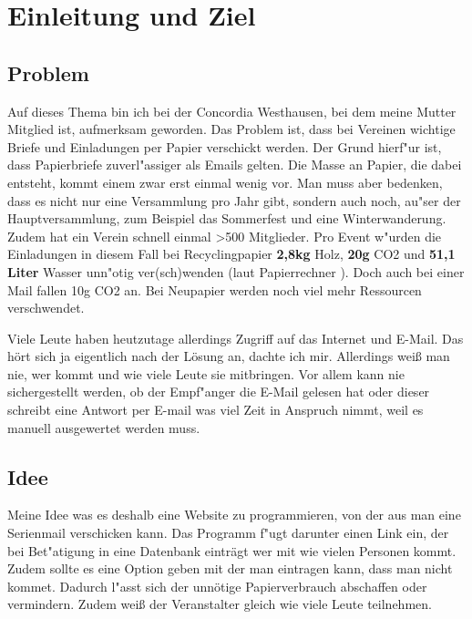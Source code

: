 \documentclass[12pt,twoside]{article}  %
\begin{document}
  \section{Einleitung und Ziel} %
    \subsection{Problem}
    Auf dieses Thema bin ich bei der Concordia Westhausen, bei dem meine Mutter Mitglied ist, aufmerksam geworden. 
    Das Problem ist, dass bei Vereinen wichtige Briefe und Einladungen per Papier verschickt werden. Der Grund hierf"ur ist, 
    dass Papierbriefe zuverl"assiger als Emails gelten. Die Masse an Papier, die dabei entsteht, kommt einem zwar erst einmal 
    wenig vor. Man muss aber bedenken, dass es nicht nur eine Versammlung pro Jahr gibt, sondern auch noch, au"ser der 
    Hauptversammlung, zum Beispiel das Sommerfest und eine Winterwanderung. Zudem hat ein Verein schnell einmal >500 Mitglieder.
    Pro Event w"urden die Einladungen in diesem Fall bei Recyclingpapier \textbf{2,8kg} Holz, \textbf{20g} CO2 und \textbf{51,1 Liter} Wasser unn"otig ver(sch)wenden (laut Papierrechner \cite{Papiergewicht}). Doch auch bei einer Mail fallen 10g CO2 an. Bei Neupapier werden noch viel mehr Ressourcen verschwendet. 
    
    Viele Leute haben heutzutage allerdings Zugriff auf das Internet und E-Mail. Das hört sich ja eigentlich 
    nach der Lösung an, dachte ich mir. Allerdings weiß man nie, wer kommt und wie
    viele Leute sie mitbringen. Vor allem kann nie sichergestellt werden, ob der Empf"anger die
    E-Mail gelesen hat oder dieser schreibt eine Antwort per E-mail was viel Zeit in Anspruch 
    nimmt, weil es manuell ausgewertet werden muss.

    \subsection{Idee}
    Meine Idee was es deshalb eine Website zu programmieren, von der aus man eine Serienmail 
    verschicken kann. Das Programm f"ugt darunter einen Link ein, der bei Bet"atigung in eine
    Datenbank einträgt wer mit wie vielen Personen kommt. Zudem sollte es eine Option
    geben mit der man eintragen kann, dass man nicht kommet. Dadurch l"asst sich
    der unnötige Papierverbrauch abschaffen oder vermindern. Zudem weiß der Veranstalter
    gleich wie viele Leute teilnehmen.
\end{document}
